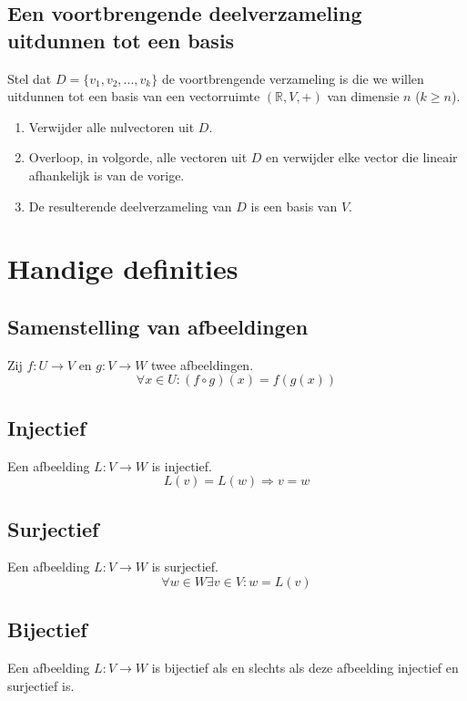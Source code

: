 \documentclass[lineaire_algebra_oplossingen.tex]{subfiles}
\begin{document}
\subsection{Een voortbrengende deelverzameling uitdunnen tot een basis}
Stel dat $D = \{v_1,v_2,...,v_k\}$ de voortbrengende verzameling is die we willen uitdunnen tot een basis van een vectorruimte $(\mathbb{R},V,+)$ van dimensie $n$ ($k\ge n$).
\begin{enumerate}
\item Verwijder alle nulvectoren uit $D$.
\item Overloop, in volgorde, alle vectoren uit $D$ en verwijder elke vector die lineair afhankelijk is van de vorige.
\item De resulterende deelverzameling van $D$ is een basis van $V$.
\end{enumerate}

\section{Handige definities}
\subsection{Samenstelling van afbeeldingen}
\label{samenstelling_van_afbeeldingen}
Zij $f: U \rightarrow V$ en $g: V\rightarrow W$ twee afbeeldingen.
\[
\forall x\in U: (f \circ g)(x) = f(g(x))
\]
\subsection{Injectief}
\label{injectief}
Een afbeelding $L: V \rightarrow W$ is injectief.
\[
L(v) = L(w) \Rightarrow v = w
\]
\subsection{Surjectief}
\label{surjectief}
Een afbeelding $L: V \rightarrow W$ is surjectief.
\[
\forall w \in W \exists v \in V: w=L(v)
\]
\subsection{Bijectief}
\label{bijectief}
Een afbeelding $L: V \rightarrow W$ is bijectief als en slechts als deze afbeelding injectief en surjectief is.
\end{document}
